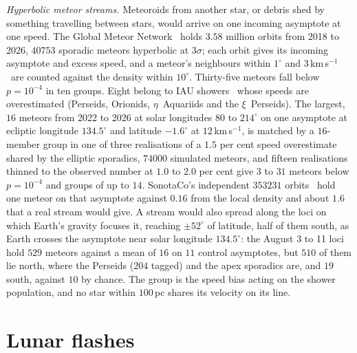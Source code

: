\documentclass[3p,11pt]{elsarticle}
\newcommand{\kms}{km\,s$^{-1}$}
\begin{document}
\emph{Hyperbolic meteor streams.} Meteoroids from another star, or debris shed by
something travelling between stars, would arrive on one incoming asymptote at one
speed. The Global Meteor Network~\cite{Vida2021} holds $3.58$ million orbits from 2018
to 2026, $40753$ sporadic meteors hyperbolic at $3\sigma$; each orbit gives its incoming
asymptote and excess speed, and a meteor's neighbours within $1^\circ$ and
$3$\,\kms\ are counted against the density within $10^\circ$. Thirty-five meteors fall
below $p=10^{-4}$ in ten groups. Eight belong to IAU showers~\cite{Jopek2017} whose
speeds are overestimated (Perseids, Orionids, $\eta$~Aquariids and the $\xi$~Perseids).
The largest, $16$ meteors from 2022 to 2026 at solar longitudes $80$ to $214^\circ$ on
one asymptote at ecliptic longitude $134.5^\circ$ and latitude $-1.6^\circ$ at
$12$\,\kms, is matched by a $16$-member group in one of three realisations of a $1.5$ per
cent speed overestimate shared by the elliptic sporadics, $74000$ simulated meteors, and
fifteen realisations thinned to the observed number at $1.0$ to $2.0$ per cent give $3$
to $31$ meteors below $p=10^{-4}$ and groups of up to $14$. SonotaCo's independent
$353231$ orbits~\cite{SonotaCo2009} hold one meteor on that asymptote against $0.16$ from
the local density and about $1.6$ that a real stream would give. A stream would also
spread along the loci on which Earth's gravity focuses it, reaching $\pm52^\circ$ of
latitude, half of them south, as Earth crosses the asymptote near solar longitude
$134.5^\circ$: the August 3 to 11 loci hold $529$ meteors against a mean of $16$ on $11$
control asymptotes, but $510$ of them lie north, where the Perseids ($204$ tagged) and
the apex sporadics are, and $19$ south, against $10$ by chance. The group is the speed
bias acting on the shower population, and no star within $100$\,pc shares its velocity
on its line.

\section{Lunar flashes}\label{sec:moon}
\end{document}
